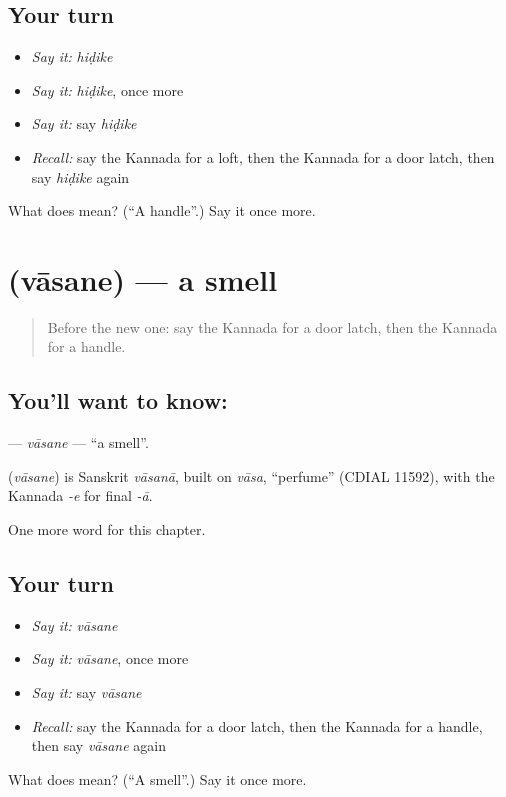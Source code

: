 \subsection*{Your turn}
\begin{itemize}
\raggedright
  \item \emph{Say it:} \emph{hiḍike}
  \item \emph{Say it:} \emph{hiḍike}, once more
  \item \emph{Say it:} say \emph{hiḍike}
  \item \emph{Recall:} say the Kannada for a loft, then the Kannada for a door latch, then say \emph{hiḍike} again
\end{itemize}

\begin{tcolorbox}[breakable,colback=teal!4,colframe=teal!35!black,title={Before you move on}]
What does  mean? (\textquotedblleft{}A handle\textquotedblright{}.) Say it once more.
\end{tcolorbox}
\section[\texorpdfstring{\kn{ವಾಸನೆ} (vāsane)}{ವಾಸನೆ (vāsane)}]{ (vāsane) — a smell}

\label{lesson:KA-C303-vasane}



\begin{quote}
Before the new one: say the Kannada for a door latch, then the Kannada for a handle.
\end{quote}

\subsection*{You'll want to know: }
\textbf{} — \emph{vāsane} — \textquotedblleft{}a smell\textquotedblright{}.

\begin{cousinweb}
\textbf{} (\emph{vāsane}) is Sanskrit \emph{vāsanā}, built on \emph{vāsa}, \textquotedblleft{}perfume\textquotedblright{} (CDIAL 11592), with the Kannada \emph{-e} for final \emph{-ā}.
\end{cousinweb}

\begin{grammarlens}[title={What you've built}]
One more word for this chapter.
\end{grammarlens}

\subsection*{Your turn}
\begin{itemize}
\raggedright
  \item \emph{Say it:} \emph{vāsane}
  \item \emph{Say it:} \emph{vāsane}, once more
  \item \emph{Say it:} say \emph{vāsane}
  \item \emph{Recall:} say the Kannada for a door latch, then the Kannada for a handle, then say \emph{vāsane} again
\end{itemize}

\begin{tcolorbox}[breakable,colback=teal!4,colframe=teal!35!black,title={Before you move on}]
What does  mean? (\textquotedblleft{}A smell\textquotedblright{}.) Say it once more.
\end{tcolorbox}

